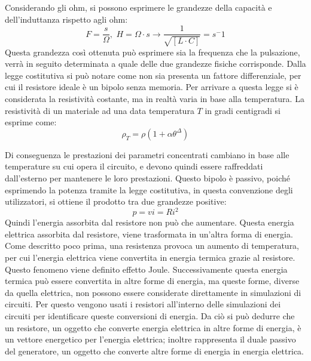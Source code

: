 \documentclass{article}
\numberwithin{equation}{subsection}
\begin{document}
Considerando gli ohm, si possono esprimere le grandezze della capacità e dell'induttanza rispetto agli ohm:
\begin{equation*}
    F=\displaystyle\frac{s}{\Omega},\,\,H=\Omega\cdot s\to \frac{1}{\sqrt{[L\cdot C]}}=s^-1
\end{equation*}
Questa grandezza così ottenuta può esprimere sia la frequenza che la pulsazione, verrà in seguito determinata a quale delle due grandezze fisiche corrisponde. 
Dalla legge costitutiva si può notare come non sia presenta un fattore differenziale, per cui il resistore ideale è un bipolo senza memoria. Per arrivare a questa legge 
si è considerata la resistività costante, ma in realtà varia in base alla temperatura. La resistività di un materiale ad una data temperatura $T$ in gradi centigradi si esprime 
come:
\begin{equation*}
    \rho_T=\rho\left(1+\alpha\theta^\Delta\right)
\end{equation*}

Di conseguenza le prestazioni dei parametri concentrati cambiano in base alle temperature su cui opera il circuito, e devono quindi essere raffreddati dall'esterno per mantenere 
le loro prestazioni. Questo bipolo è passivo, poiché esprimendo la potenza tramite la legge costitutiva, in questa convenzione degli utilizzatori, si ottiene il prodotto 
tra due grandezze positive:
\begin{equation*}
    p=vi=Ri^2
\end{equation*}
Quindi l'energia assorbita dal resistore non può che aumentare. Questa energia elettrica assorbita dal resistore, viene trasformata in un'altra forma di energia. Come 
descritto poco prima, una resistenza provoca un aumento di temperatura, per cui l'energia elettrica viene convertita in energia termica grazie al resistore. Questo fenomeno 
viene definito effetto Joule. Successivamente questa energia termica può essere convertita in altre forme di energia, ma queste forme, diverse da quella elettrica, non possono 
essere considerate direttamente in simulazioni di circuiti. Per questo vengono usati i resistori all'interno delle simulazioni dei circuiti per identificare queste 
conversioni di energia. Da ciò si può dedurre che un resistore, un oggetto che converte energia elettrica in altre forme di energia, è un vettore energetico per l'energia 
elettrica; inoltre rappresenta il duale passivo del generatore, un oggetto che converte altre forme di energia in energia elettrica. 
\end{document}

